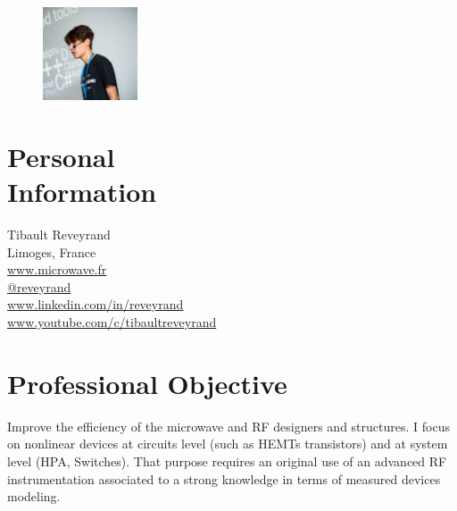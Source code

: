 \documentclass[margin,line]{resume}
\begin{document}
\begin{resume}

    \vspace{0.5cm}
    \begin{figure}
         \vspace{-1.0cm}
        \begin{center}
        \includegraphics[width=0.25\textwidth]{me.jpg}
        \end{center}
         \vspace{-1cm}
    \end{figure}


    \section{\mysidestyle Personal\\Information}
    Tibault Reveyrand \\
    Limoges, France\\
    \faTv  \space \href{http://www.microwave.fr}{www.microwave.fr} \\
    \faTwitter  \space \href{https://twitter.com/reveyrand/}{@reveyrand} \\
    \faLinkedin \space \href{http://www.linkedin.com/in/reveyrand/}{www.linkedin.com/in/reveyrand} \\
    \faYoutubePlay  \space \href{https://www.youtube.com/c/tibaultreveyrand/}{www.youtube.com/c/tibaultreveyrand}


    \section{\mysidestyle Professional Objective}
    Improve the efficiency of the microwave and RF designers and structures. I focus on nonlinear devices at circuits level (such as HEMTs transistors) and at system level (HPA, Switches). That purpose requires an original use of an advanced RF instrumentation associated to a strong knowledge in terms of measured devices modeling.


\end{resume}
\end{document}
